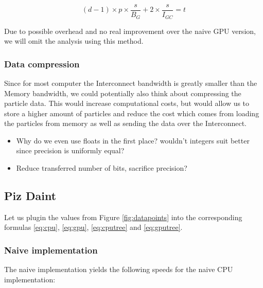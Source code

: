 \documentclass[]{article}
\begin{document}
\begin{center}
	\begin{equation}
		(d-1) \times p \times \frac{s}{B_{G}} + 2 \times \frac{s}{I_{GC}} = t
		\label{eq:gpubatch}
	\end{equation}
\end{center}

Due to possible overhead and no real improvement over the naive GPU version, we will omit the analysis using this method.

\subsubsection{Data compression}

Since for most computer the Interconnect bandwidth is greatly smaller than the Memory bandwidth, we could potentially also think about compressing the particle data. This would increase computational costs, but would allow us to store a higher amount of particles and reduce the cost which comes from loading the particles from memory as well as sending the data over the Interconnect.

\begin{itemize}
	\item Why do we even use floats in the first place? wouldn't integers suit better since precision is uniformly equal?
	\item Reduce transferred number of bits, sacrifice precision?
\end{itemize}


\newcommand\s{12}

\newcommand\p{32}


\normalfont
\subsection{Piz Daint} 

Let us plugin the values from Figure \ref{fig:datapoints} into the corresponding formulas \ref{eq:cpu}, \ref{eq:gpu}, \ref{eq:cputree} and \ref{eq:gputree}.

\subsubsection{Naive implementation}
The naive implementation yields the following speeds for the naive CPU  implementation:

\pgfmathsetmacro\cpuPiz{ln(1024) / ln(2) * (\p * \s / 68)}
\end{document}

